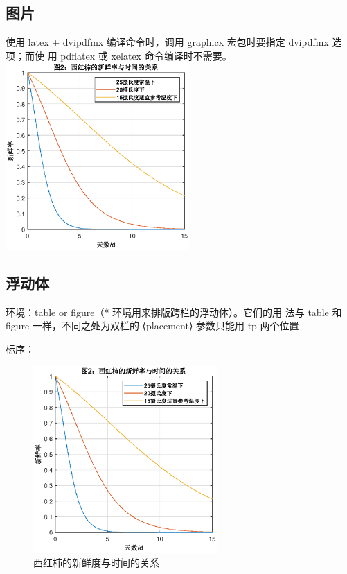 \documentclass[10pt,a4paper,twocolumn]{book}
\begin{document}
\subsection{图片}
使用 latex + dvipdfmx 编译命令时，调用 graphicx 宏包时要指定
dvipdfmx 选项；而使 用 pdflatex 或 xelatex 命令编译时不需要。
\includegraphics[width=7cm]{figures/index.eps}

\subsection{浮动体}

环境：table or figure（* 环境用来排版跨栏的浮动体）。它们的用 法与 table 和
 figure 一样，不同之处为双栏的 ⟨placement⟩ 参数只能用 tp 两个位置
 
标序：
\begin{figure}[htbp]
    \centering
    \includegraphics[width=7cm]{figures/index.eps}
    \caption{西红柿的新鲜度与时间的关系}
\end{figure}
\end{document}
